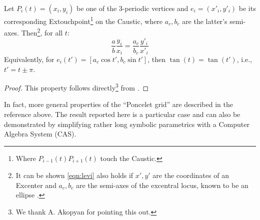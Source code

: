 \begin{proposition}
Let $P_i(t)=(x_i,y_i)$ be one of the 3-periodic vertices and $e_i=(x'_i,y'_i)$ be its corresponding Extouchpoint\footnote{Where $P_{i-1}(t)P_{i+1}(t)$ touch the Caustic.}  on the Caustic, where $a_c,b_c$ are the latter's semi-axes. Then\footnote{It can be shown \eqref{eqn:levi} also holds if $x',y'$ are the coordinates of an Excenter and $a_c,b_c$ are the semi-axes of the excentral locus, known to be an ellipse \cite{garcia2019-incenter}.}, for all $t$:
%
\begin{equation}
\frac{a}{b}\frac{y_i}{x_i}=\frac{a_c}{b_c}\frac{y'_i}{x'_i}
\label{eqn:levi}
\end{equation}
%
\noindent Equivalently, for $e_i(t')=[a_c \cos{t'},b_c\sin{t'}]$, then $\tan(t)=\tan(t')$, i.e., $t'=t{\pm}\pi$.
\label{lem:extouch}
\end{proposition}

\begin{proof}
This property follows directly\footnote{We thank A. Akopyan for pointing this out.} from \cite[Lemma 3]{levi2007-poncelet-grid}.
\end{proof}

In fact,  more general properties of the 
``Poncelet grid'' are described in 
the reference above. The  result reported here is a particular case and can also be demonstrated by simplifying rather long symbolic parametrics with a Computer Algebra System (CAS). 
 


